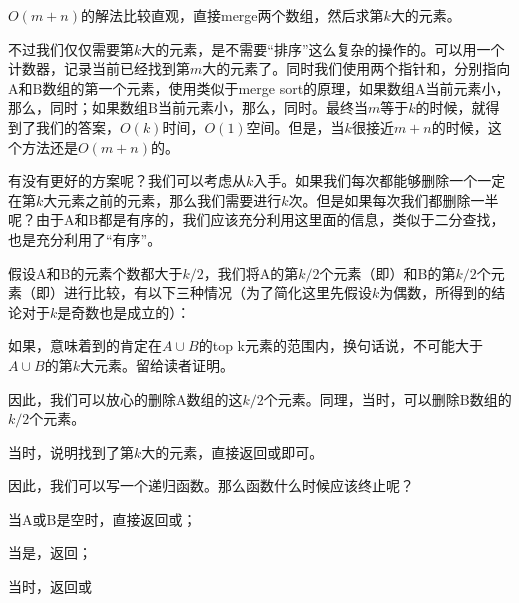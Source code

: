 $O(m+n)$的解法比较直观，直接merge两个数组，然后求第$k$大的元素。

不过我们仅仅需要第$k$大的元素，是不需要“排序”这么复杂的操作的。可以用一个计数器，记录当前已经找到第$m$大的元素了。同时我们使用两个指针和，分别指向A和B数组的第一个元素，使用类似于merge sort的原理，如果数组A当前元素小，那么，同时；如果数组B当前元素小，那么，同时。最终当$m$等于$k$的时候，就得到了我们的答案，$O(k)$时间，$O(1)$空间。但是，当$k$很接近$m+n$的时候，这个方法还是$O(m+n)$的。

有没有更好的方案呢？我们可以考虑从$k$入手。如果我们每次都能够删除一个一定在第$k$大元素之前的元素，那么我们需要进行$k$次。但是如果每次我们都删除一半呢？由于A和B都是有序的，我们应该充分利用这里面的信息，类似于二分查找，也是充分利用了“有序”。

假设A和B的元素个数都大于$k/2$，我们将A的第$k/2$个元素（即）和B的第$k/2$个元素（即）进行比较，有以下三种情况（为了简化这里先假设$k$为偶数，所得到的结论对于$k$是奇数也是成立的）：
\begindot
\item {}
\item {}
\item {}
\myenddot

如果，意味着到\fn{A[k/2-1}的肯定在$A \cup B$的top k元素的范围内，换句话说，\fn{A[k/2-1}不可能大于$A \cup B$的第$k$大元素。留给读者证明。

因此，我们可以放心的删除A数组的这$k/2$个元素。同理，当时，可以删除B数组的$k/2$个元素。

当时，说明找到了第$k$大的元素，直接返回或即可。

因此，我们可以写一个递归函数。那么函数什么时候应该终止呢？
\begindot
\item 当A或B是空时，直接返回或；
\item 当是，返回；
\item 当时，返回或
\myenddot


